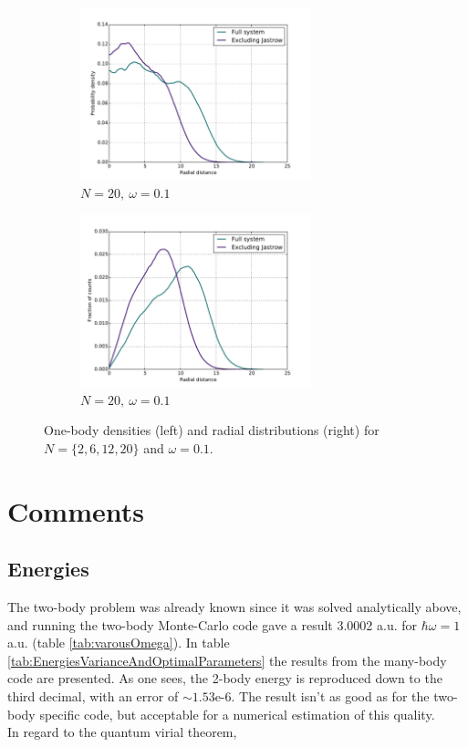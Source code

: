 \documentclass[english, a4paper]{article}
\begin{document}
\begin{figure}[H]
	\begin{subfigure}{0.5\textwidth}
		\includegraphics[width=\textwidth, height= 5cm]{figures/radialDistribution/OneBodyDensityN20w10Se8.pdf}
		\caption{$N=20,\:\omega=0.1$}
	\end{subfigure}
	\begin{subfigure}{0.5\textwidth}
		\includegraphics[width=\textwidth, height= 5cm]{figures/radialDistribution/radialDistributionN20w10Se7.pdf}
		\caption{$N=20,\:\omega=0.1$}
	\end{subfigure}

	\vspace{3mm}
	
	\caption{One-body densities (left) and radial distributions (right) for $N=\{2,6,12,20\}$ and $\omega = 0.1$.}
	\label{fig:Onebody&RadialDistw10}
\end{figure}
	
	
	\section{Comments}
	\subsection{Energies}
	The two-body problem was already known since it was solved analytically above, and running the two-body Monte-Carlo code gave a result 3.0002 a.u. for $\hbar\omega = 1$ a.u. (table \ref{tab:varousOmega}). In table \ref{tab:EnergiesVarianceAndOptimalParameters} the results from the many-body code are presented. As one sees, the 2-body energy is reproduced down to the third decimal, with an error of $\sim 1.53$e-6. The result isn't as good as for the two-body specific code, but acceptable for a numerical estimation of this quality.\\
	In regard to the quantum virial theorem,
	
\end{document}

